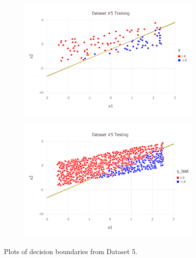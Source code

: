 \begin{figure}[h!]
\centering
    \begin{subfigure}[b]{0.45\textwidth}
	\includegraphics[scale=0.6]{figures/train_final_5.pdf}
    \end{subfigure}
    \quad
    \begin{subfigure}[b]{0.45\textwidth}
	\includegraphics[scale=0.6]{figures/test_final_5.pdf}
	\end{subfigure}
    \caption{Plots of decision boundaries from Dataset 5.}  \label{fig:dataset_5}  
\end{figure}
